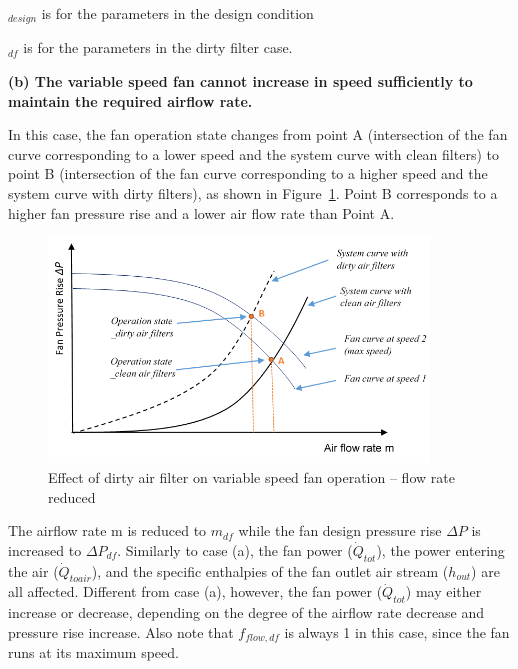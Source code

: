\(_{design}\) is for the parameters in the design condition

\(_{df}\) is for the parameters in the dirty filter case.

\textbf{(b) The variable speed fan cannot increase in speed sufficiently to maintain the required airflow rate.}

In this case, the fan operation state changes from point A (intersection of the fan curve corresponding to a lower speed and the system curve with clean filters) to point B (intersection of the fan curve corresponding to a higher speed and the system curve with dirty filters), as shown in Figure~\ref{fig:effect-of-dirty-air-filter-on-variable-speed-001}. Point B corresponds to a higher fan pressure rise and a lower air flow rate than Point A.

\begin{figure}[hbtp] %
\centering
\includegraphics[width=0.9\textwidth, height=0.9\textheight, keepaspectratio=true]{media/image8007.png}
\caption{Effect of dirty air filter on variable speed fan operation – flow rate reduced \protect \label{fig:effect-of-dirty-air-filter-on-variable-speed-001}}
\end{figure}

The airflow rate m is reduced to \(m_{df}\) while the fan design pressure rise \(\Delta P\) is increased to \(\Delta P_{df}\). Similarly to case (a), the fan power (\(\dot Q_{tot}\)), the power entering the air (\(\dot Q_{toair}\)), and the specific enthalpies of the fan outlet air stream (\(h_{out}\)) are all affected. Different from case (a), however, the fan power (\(\dot Q_{tot}\)) may either increase or decrease, depending on the degree of the airflow rate decrease and pressure rise increase. Also note that \(f_{flow,df}\) is always 1 in this case, since the fan runs at its maximum speed.

